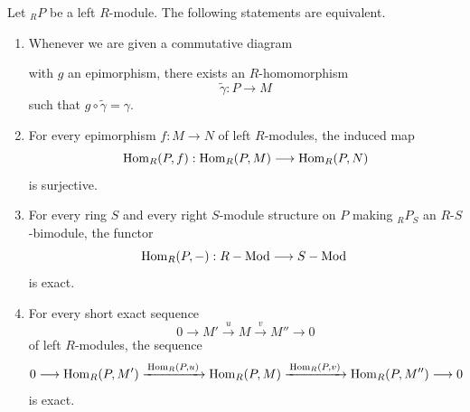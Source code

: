 \begin{theorem}
    Let ${}_R P$ be a left $R$-module. The following statements are equivalent.
    \begin{enumerate}
        \item Whenever we are given a commutative diagram
              \begin{center}
              \end{center}
              with $g$ an epimorphism, there exists an $R$-homomorphism
              \[
                  \widetilde{\gamma}:P\to M
              \]
              such that $g\circ \widetilde{\gamma}=\gamma$.
        \item For every epimorphism $f:M\to N$ of left $R$-modules, the induced map
              \[
                  \mathrm{Hom}_R(P,f):\mathrm{Hom}_R(P,M)\longrightarrow \mathrm{Hom}_R(P,N)
              \]
              is surjective.
        \item For every ring $S$ and every right $S$-module structure on $P$ making ${}_R P_S$ an $R$-$S$-bimodule, the functor
              \[
                  \mathrm{Hom}_R(P,-): R - \mathrm{Mod}\longrightarrow S-\mathrm{Mod}\
              \]
              is exact.
        \item For every short exact sequence
              \[
                  0\longrightarrow M' \xrightarrow{\,u\,} M \xrightarrow{\,v\,} M'' \longrightarrow 0
              \]
              of left $R$-modules, the sequence
              \[
                  0\longrightarrow \mathrm{Hom}_R(P,M')
                  \xrightarrow{\,\mathrm{Hom}_R(P,u)\,}
                  \mathrm{Hom}_R(P,M)
                  \xrightarrow{\,\mathrm{Hom}_R(P,v)\,}
                  \mathrm{Hom}_R(P,M'')
                  \longrightarrow 0
              \]
              is exact.
    \end{enumerate}
\end{theorem}

